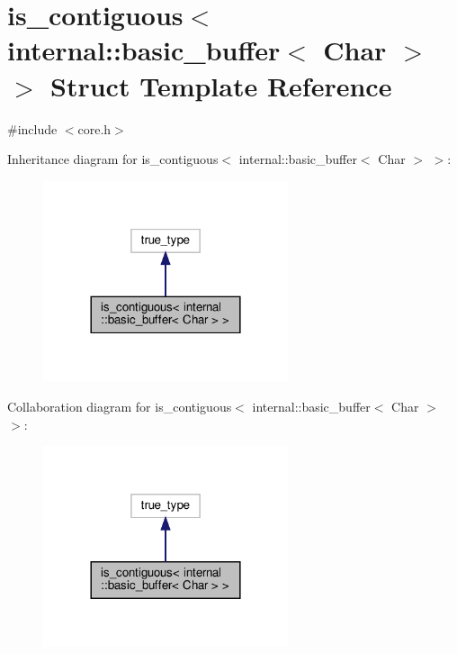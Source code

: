 \hypertarget{structis__contiguous_3_01internal_1_1basic__buffer_3_01_char_01_4_01_4}{}\section{is\+\_\+contiguous$<$ internal\+:\+:basic\+\_\+buffer$<$ Char $>$ $>$ Struct Template Reference}
\label{structis__contiguous_3_01internal_1_1basic__buffer_3_01_char_01_4_01_4}


{\ttfamily \#include $<$core.\+h$>$}



Inheritance diagram for is\+\_\+contiguous$<$ internal\+:\+:basic\+\_\+buffer$<$ Char $>$ $>$\+:
\nopagebreak
\begin{figure}[H]
\begin{center}
\leavevmode
\includegraphics[width=204pt]{structis__contiguous_3_01internal_1_1basic__buffer_3_01_char_01_4_01_4__inherit__graph}
\end{center}
\end{figure}


Collaboration diagram for is\+\_\+contiguous$<$ internal\+:\+:basic\+\_\+buffer$<$ Char $>$ $>$\+:
\nopagebreak
\begin{figure}[H]
\begin{center}
\leavevmode
\includegraphics[width=204pt]{structis__contiguous_3_01internal_1_1basic__buffer_3_01_char_01_4_01_4__coll__graph}
\end{center}
\end{figure}


